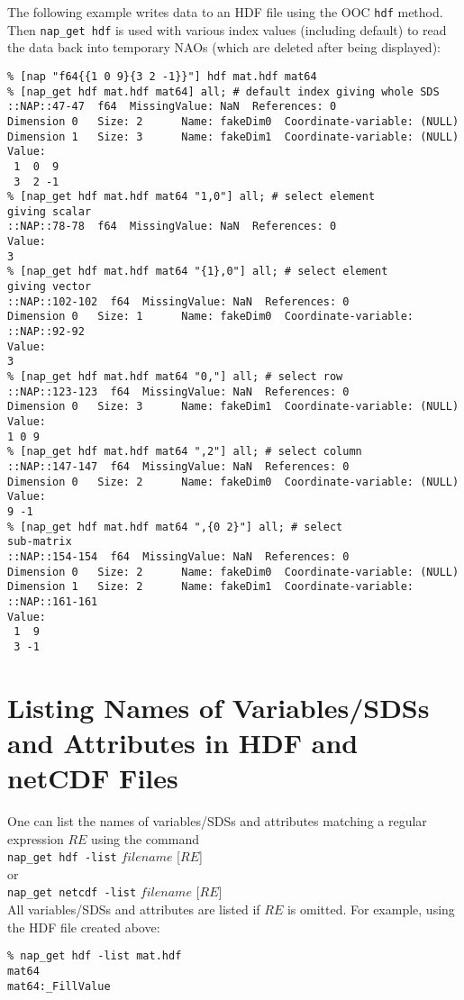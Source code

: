 The following example writes data to an HDF file using the OOC 
  \texttt{hdf} method. Then 
  \texttt{nap\_get hdf} is used with various index values (including
  default) to read the data back into temporary NAOs (which are deleted
  after being displayed):
  \begin{verbatim}
% [nap "f64{{1 0 9}{3 2 -1}}"] hdf mat.hdf mat64
% [nap_get hdf mat.hdf mat64] all; # default index giving whole SDS
::NAP::47-47  f64  MissingValue: NaN  References: 0
Dimension 0   Size: 2      Name: fakeDim0  Coordinate-variable: (NULL)
Dimension 1   Size: 3      Name: fakeDim1  Coordinate-variable: (NULL)
Value:
 1  0  9
 3  2 -1
% [nap_get hdf mat.hdf mat64 "1,0"] all; # select element
giving scalar
::NAP::78-78  f64  MissingValue: NaN  References: 0
Value:
3
% [nap_get hdf mat.hdf mat64 "{1},0"] all; # select element
giving vector
::NAP::102-102  f64  MissingValue: NaN  References: 0
Dimension 0   Size: 1      Name: fakeDim0  Coordinate-variable: ::NAP::92-92
Value:
3
% [nap_get hdf mat.hdf mat64 "0,"] all; # select row
::NAP::123-123  f64  MissingValue: NaN  References: 0
Dimension 0   Size: 3      Name: fakeDim1  Coordinate-variable: (NULL)
Value:
1 0 9
% [nap_get hdf mat.hdf mat64 ",2"] all; # select column
::NAP::147-147  f64  MissingValue: NaN  References: 0
Dimension 0   Size: 2      Name: fakeDim0  Coordinate-variable: (NULL)
Value:
9 -1
% [nap_get hdf mat.hdf mat64 ",{0 2}"] all; # select
sub-matrix
::NAP::154-154  f64  MissingValue: NaN  References: 0
Dimension 0   Size: 2      Name: fakeDim0  Coordinate-variable: (NULL)
Dimension 1   Size: 2      Name: fakeDim1  Coordinate-variable: ::NAP::161-161
Value:
 1  9
 3 -1
\end{verbatim}

\section{Listing Names of Variables/SDSs and Attributes in HDF and netCDF Files}
    \label{nap-get-Listing-Names}

One can list the names of variables/SDSs and attributes matching
  a regular expression 
  $\mathit{RE}$ using the command
\\
\texttt{nap\_get hdf -list} $\mathit{filename}$ [$\mathit{RE}$]
\\or
\\
\texttt{nap\_get netcdf -list} $\mathit{filename}$ [$\mathit{RE}$]
\\All variables/SDSs and attributes are listed if 
  $\mathit{RE}$ is omitted. For example, using the HDF file created
  above:
  \begin{verbatim}
% nap_get hdf -list mat.hdf
mat64
mat64:_FillValue
\end{verbatim}

